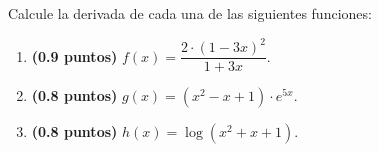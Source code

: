 
Calcule la derivada de cada una de las siguientes funciones:
\begin{enumerate}[label=\alph*)]
\item \textbf{(0.9 puntos)} $f(x)=\dfrac{2\cdot(1-3x)^2}{1+3x}$.
\item \textbf{(0.8 puntos)} $g(x)=(x^2-x+1)\cdot e^{5x}$.
\item \textbf{(0.8 puntos)} $h(x)=\log(x^2+x+1)$.
\end{enumerate}
